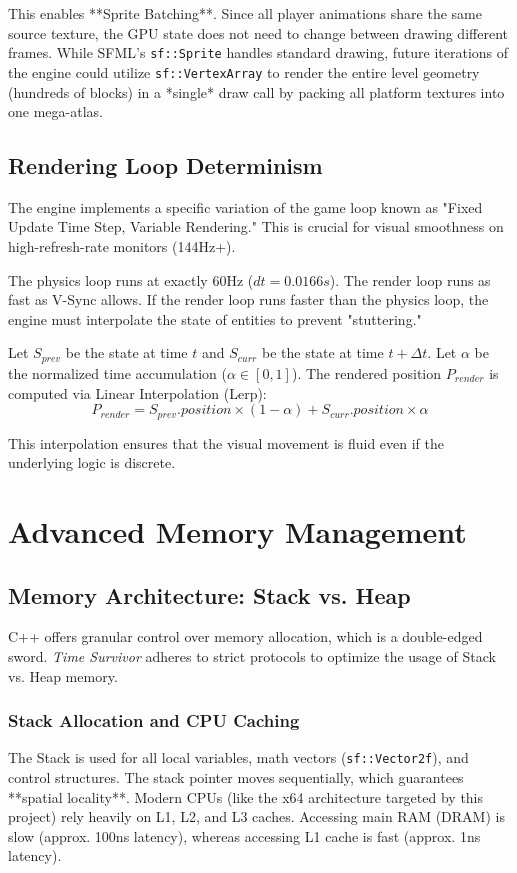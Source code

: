 \documentclass[10pt, a4paper]{article}
\begin{document}
This enables **Sprite Batching**. Since all player animations share the same source texture, the GPU state does not need to change between drawing different frames. While SFML's \texttt{sf::Sprite} handles standard drawing, future iterations of the engine could utilize \texttt{sf::VertexArray} to render the entire level geometry (hundreds of blocks) in a *single* draw call by packing all platform textures into one mega-atlas.

\subsection{Rendering Loop Determinism}
The engine implements a specific variation of the game loop known as "Fixed Update Time Step, Variable Rendering." This is crucial for visual smoothness on high-refresh-rate monitors (144Hz+).

The physics loop runs at exactly 60Hz ($dt = 0.0166s$). The render loop runs as fast as V-Sync allows. If the render loop runs faster than the physics loop, the engine must interpolate the state of entities to prevent "stuttering."

Let $S_{prev}$ be the state at time $t$ and $S_{curr}$ be the state at time $t + \Delta t$.
Let $\alpha$ be the normalized time accumulation ($\alpha \in [0, 1]$).
The rendered position $P_{render}$ is computed via Linear Interpolation (Lerp):
\begin{equation}
P_{render} = S_{prev}.position \times (1 - \alpha) + S_{curr}.position \times \alpha
\end{equation}

This interpolation ensures that the visual movement is fluid even if the underlying logic is discrete.

\newpage

\section{Advanced Memory Management}

\subsection{Memory Architecture: Stack vs. Heap}
C++ offers granular control over memory allocation, which is a double-edged sword. \textit{Time Survivor} adheres to strict protocols to optimize the usage of Stack vs. Heap memory.

\subsubsection{Stack Allocation and CPU Caching}
The Stack is used for all local variables, math vectors (\texttt{sf::Vector2f}), and control structures. The stack pointer moves sequentially, which guarantees **spatial locality**.
Modern CPUs (like the x64 architecture targeted by this project) rely heavily on L1, L2, and L3 caches. Accessing main RAM (DRAM) is slow (approx. 100ns latency), whereas accessing L1 cache is fast (approx. 1ns latency). 
\end{document}
